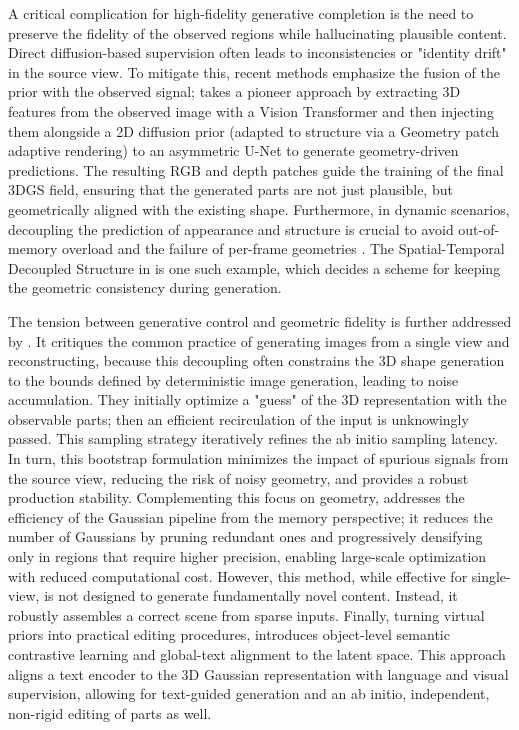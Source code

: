 \documentclass[11pt,a4paper]{article}
\begin{document}
A critical complication for high-fidelity generative completion is the need to preserve the fidelity of the observed regions while hallucinating plausible content. Direct diffusion-based supervision often leads to inconsistencies or "identity drift" in the source view. To mitigate this, recent methods \cite{arxiv:2506.02751v3,arxiv:2511.16298v1,arxiv:2602.08909v1} emphasize the fusion of the prior with the observed signal; \cite{arxiv:2506.02751v3} takes a pioneer approach by extracting 3D features from the observed image with a Vision Transformer and then injecting them alongside a 2D diffusion prior (adapted to structure via a Geometry patch adaptive rendering) to an asymmetric U-Net to generate geometry-driven predictions. The resulting RGB and depth patches guide the training of the final 3DGS field, ensuring that the generated parts are not just plausible, but geometrically aligned with the existing shape. Furthermore, in dynamic scenarios, decoupling the prediction of appearance and structure is crucial to avoid out-of-memory overload and the failure of per-frame geometries \cite{arxiv:1702.03253v1,arxiv:2312.08746v2}. The Spatial-Temporal Decoupled Structure in \cite{arxiv:2506.02751v3} is one such example, which decides a scheme for keeping the geometric consistency during generation.

The tension between generative control and geometric fidelity is further addressed by \cite{arxiv:2510.26694v1}. It critiques the common practice of generating images from a single view and reconstructing, because this decoupling often constrains the 3D shape generation to the bounds defined by deterministic image generation, leading to noise accumulation. They initially optimize a "guess" of the 3D representation with the observable parts; then an efficient recirculation of the input is unknowingly passed. This sampling strategy iteratively refines the ab initio sampling latency. In turn, this bootstrap formulation minimizes the impact of spurious signals from the source view, reducing the risk of noisy geometry, and provides a robust production stability. Complementing this focus on geometry, \cite{arxiv:2503.09447v3} addresses the efficiency of the Gaussian pipeline from the memory perspective; it reduces the number of Gaussians by pruning redundant ones and progressively densifying only in regions that require higher precision, enabling large-scale optimization with reduced computational cost. However, this method, while effective for single-view, is not designed to generate fundamentally novel content. Instead, it robustly assembles a correct scene from sparse inputs. Finally, turning virtual priors into practical editing procedures, \cite{arxiv:1902.09134v1} introduces object-level semantic contrastive learning and global-text alignment to the latent space. This approach aligns a text encoder to the 3D Gaussian representation with language and visual supervision, allowing for text-guided generation and an ab initio, independent, non-rigid editing of parts as well.
\end{document}
